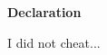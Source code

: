 \thispagestyle{plain}
\begin{center}
	\large
    \textbf{Declaration}
\end{center}
I did not cheat...